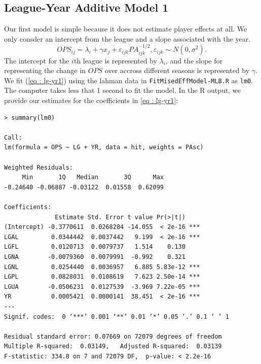 \documentclass [52pt] {article}
\begin{document}
\subsection{League-Year Additive Model 1}
Our first model is simple because it does not estimate player effects at all.  We only consder an intercept from the league and a slope associated with the year.
\begin{equation}\label{eq : lg-yr1}
OPS_{ij} = \lambda_i + \gamma x_j + \varepsilon_{ijk} PA_{ijk}^{-1/2}, \varepsilon_{ijk}\sim N(0,\sigma^2).
\end{equation}
The intercept for the $i$th league is represented by $\lambda_i$, and the slope for representing the change in $OPS$ over accross different seasons is represented by $\gamma$.  We fit (\ref{eq : lg-yr1}) using the lahman data in \verb|FitMisedEffModel-MLB.R| as \verb|lm0|.  The computer takes less that 1 second to fit the model.  In the R output, we provide our estimates for the coefficients in \ref{eq : lg-yr1}:
\begin{verbatim}
> summary(lm0)

Call:
lm(formula = OPS ~ LG + YR, data = hit, weights = PAsc)

Weighted Residuals:
     Min       1Q   Median       3Q      Max 
-0.24640 -0.06887 -0.03122  0.01558  0.62099 

Coefficients:
              Estimate Std. Error t value Pr(>|t|)    
(Intercept) -0.3770611  0.0268284 -14.055  < 2e-16 ***
LGAL         0.0344442  0.0037442   9.199  < 2e-16 ***
LGFL         0.0120713  0.0079737   1.514    0.130    
LGNA        -0.0079360  0.0079991  -0.992    0.321    
LGNL         0.0254440  0.0036957   6.885 5.83e-12 ***
LGPL         0.0828031  0.0108619   7.623 2.50e-14 ***
LGUA        -0.0506231  0.0127539  -3.969 7.22e-05 ***
YR           0.0005421  0.0000141  38.451  < 2e-16 ***
---
Signif. codes:  0 ‘***’ 0.001 ‘**’ 0.01 ‘*’ 0.05 ‘.’ 0.1 ‘ ’ 1

Residual standard error: 0.07669 on 72079 degrees of freedom
Multiple R-squared:  0.03149,	Adjusted R-squared:  0.03139 
F-statistic: 334.8 on 7 and 72079 DF,  p-value: < 2.2e-16
\end{verbatim}
\end{document}
